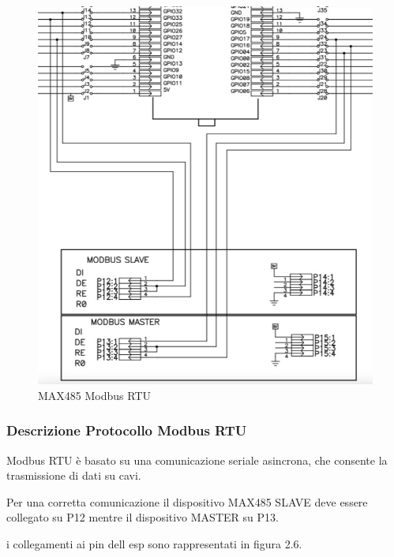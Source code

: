 \documentclass[12pt,a4paper]{report}
\begin{document}
\begin{figure}[H]
    \centering
    \includegraphics[width=0.9\linewidth]{../image/ModbusWiring.png}
    \caption{MAX485 Modbus RTU}
\end{figure}

\subsubsection{Descrizione Protocollo Modbus RTU}
Modbus RTU è basato su una comunicazione seriale asincrona, che consente la trasmissione di dati su cavi.

Per una corretta comunicazione il dispositivo MAX485 SLAVE deve essere collegato su P12 mentre il dispositivo MASTER su P13.

i collegamenti ai pin dell esp sono rappresentati in figura 2.6.
\end{document}
